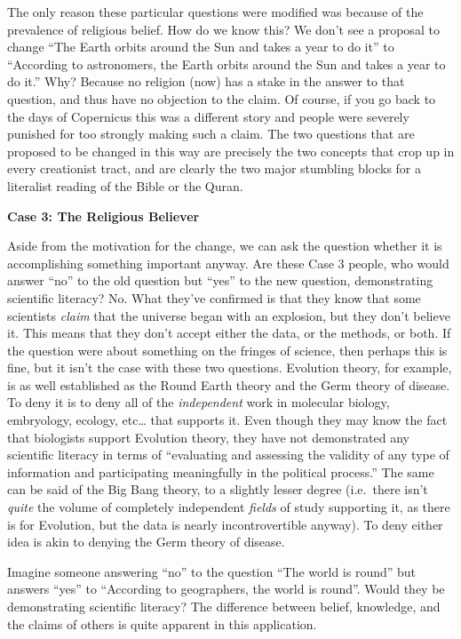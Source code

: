 The only reason these particular questions were modified was because of
the prevalence of religious belief. How do we know this? We don't see a
proposal to change ``The Earth orbits around the Sun and takes a year to
do it'' to ``According to astronomers, the Earth orbits around the Sun
and takes a year to do it.'' Why? Because no religion (now) has a stake
in the answer to that question, and thus have no objection to the claim.
Of course, if you go back to the days of Copernicus this was a different
story and people were severely punished for too strongly making such a
claim. The two questions that are proposed to be changed in this way are
precisely the two concepts that crop up in every creationist tract, and
are clearly the two major stumbling blocks for a literalist reading of
the Bible or the Quran.

{\textbf{Case 3: The Religious Believer}}

Aside from the motivation for the change, we can ask the question
whether it is accomplishing something important anyway. Are these Case 3
people, who would answer ``no'' to the old question but ``yes'' to the
new question, demonstrating scientific literacy?  No.  What they've confirmed is that they know that some scientists \emph{claim}
that the universe began with an explosion, but they don't believe it.
This means that they don't accept either the data, or the methods, or both. If
the question were about something on the fringes of science, then
perhaps this is fine, but it isn't the case with these two questions.
Evolution theory, for example, is as well established as the Round Earth
theory and the Germ theory of disease. To deny it is to deny all of the
\emph{independent} work in molecular biology, embryology, ecology,
etc\ldots{} that supports it. Even though they may know the fact that
biologists support Evolution theory, they have not demonstrated any
scientific literacy in terms of ``evaluating and assessing the validity
of any type of information and participating meaningfully in the
political process.'' The same can be said of the Big Bang theory, to a
slightly lesser degree (i.e.~there isn't \emph{quite} the volume of
completely independent \emph{fields} of study supporting it, as there is
for Evolution, but the data is nearly incontrovertible anyway). To deny
either idea is akin to denying the Germ theory of disease.

Imagine someone answering ``no'' to the question ``The world is round''
but answers ``yes'' to ``According to geographers, the world is round''.
Would they be demonstrating scientific literacy?  The difference between belief, knowledge, and the claims of others is quite apparent in this application.


